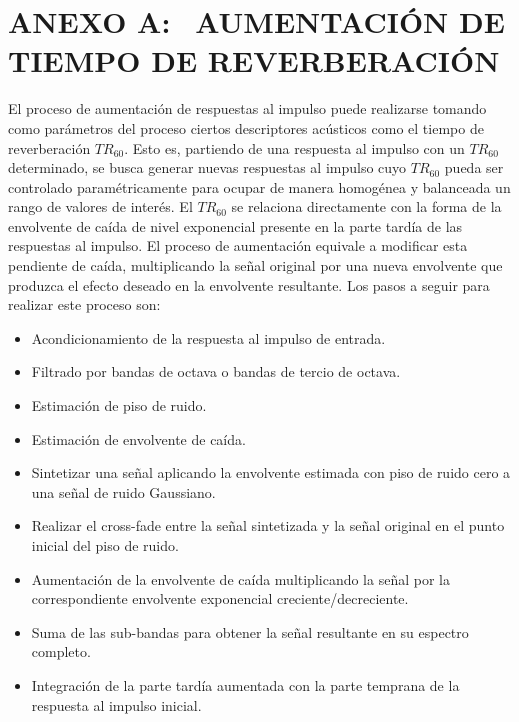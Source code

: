 \section[Aumentación de tiempo de reverberación]{ANEXO A:$\ \ \ \ $AUMENTACIÓN DE TIEMPO DE REVERBERACIÓN}

El proceso de aumentación de respuestas al impulso puede realizarse tomando como parámetros del proceso ciertos descriptores acústicos como el tiempo de reverberación $TR_{60}$. Esto es, partiendo de una respuesta al impulso con un $TR_{60}$ determinado, se busca generar nuevas respuestas al impulso cuyo $TR_{60}$ pueda ser controlado paramétricamente para ocupar de manera homogénea y balanceada un rango de valores de interés. 
El $TR_{60}$ se relaciona directamente con la forma de la envolvente de caída de nivel exponencial presente en la parte tardía de las respuestas al impulso. El proceso de aumentación equivale a modificar esta pendiente de caída, multiplicando la señal original por una nueva envolvente que produzca el efecto deseado en la envolvente resultante. Los pasos a seguir para realizar este proceso son: 

\begin{itemize}
  \item Acondicionamiento de la respuesta al impulso de entrada.
  \item Filtrado por bandas de octava o bandas de tercio de octava.
  \item Estimación de piso de ruido.
  \item Estimación de envolvente de caída.
  \item Sintetizar una señal aplicando la envolvente estimada con piso de ruido cero a una señal de ruido Gaussiano. 
  \item Realizar el cross-fade entre la señal sintetizada y la señal original en el punto inicial del piso de ruido.
  \item Aumentación de la envolvente de caída multiplicando la señal por la correspondiente envolvente exponencial creciente/decreciente.
  \item Suma de las sub-bandas para obtener la señal resultante en su espectro completo.
  \item Integración de la parte tardía aumentada con la parte temprana de la respuesta al impulso inicial.
\end{itemize} 	

